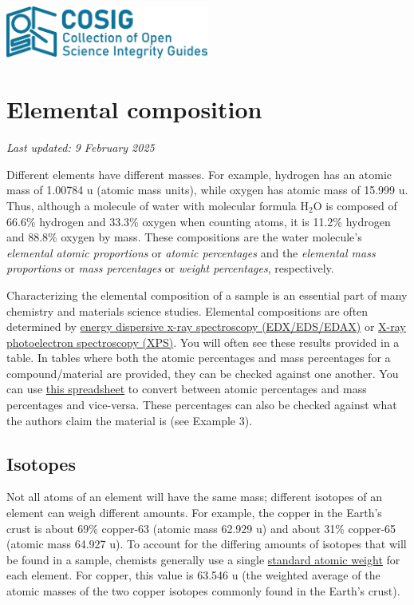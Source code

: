 \documentclass[letterpaper, 12pt]{article}
\begin{document}
\flushleft
\includegraphics[width=0.5\textwidth]{img/home/241017_final_logo_mockup.png}

\section*{Elemental composition}
\textit{Last updated: 9 February 2025}

Different elements have different masses. For example, hydrogen has an atomic mass of 1.00784 u (atomic mass units), while oxygen has atomic mass of 15.999 u. Thus, although a molecule of water with molecular formula H$_2$O is composed of 66.6\% hydrogen and 33.3\% oxygen when counting atoms, it is 11.2\% hydrogen and 88.8\% oxygen by mass. These compositions are the water molecule's \textit{elemental atomic proportions} or \textit{atomic percentages} and the \textit{elemental mass proportions} or \textit{mass percentages} or \textit{weight percentages}, respectively.

Characterizing the elemental composition of a sample is an essential part of many chemistry and materials science studies. Elemental compositions are often determined by \href{https://en.wikipedia.org/wiki/Energy-dispersive_X-ray_spectroscopy}{energy dispersive x-ray spectroscopy (EDX/EDS/EDAX)} or \href{https://en.wikipedia.org/wiki/X-ray_photoelectron_spectroscopy}{X-ray photoelectron spectroscopy (XPS)}. You will often see these results provided in a table. In tables where both the atomic percentages and mass percentages for a compound/material are provided, they can be checked against one another. You can use \href{https://osf.io/gp4mf}{this spreadsheet} to convert between atomic percentages and mass percentages and vice-versa. These percentages can also be checked against what the authors claim the material is (see Example 3).

\subsection*{Isotopes}

Not all atoms of an element will have the same mass; different isotopes of an element can weigh different amounts. For example, the copper in the Earth's crust is about 69\% copper-63 (atomic mass 62.929 u) and about 31\% copper-65 (atomic mass 64.927 u). To account for the differing amounts of isotopes that will be found in a sample, chemists generally use a single \href{https://en.wikipedia.org/wiki/Standard_atomic_weight}{standard atomic weight} for each element. For copper, this value is 63.546 u (the weighted average of the atomic masses of the two copper isotopes commonly found in the Earth's crust).
\end{document}
